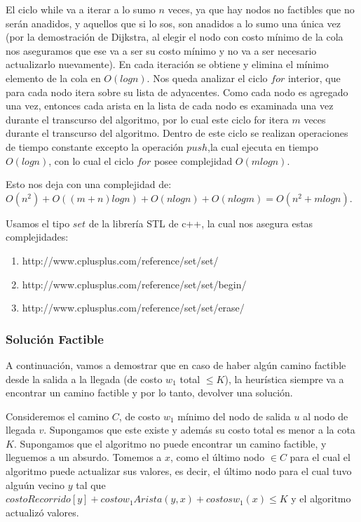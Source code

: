 \vspace{2mm}

El ciclo while va a iterar a lo sumo $n$ veces, ya que hay nodos no factibles que no ser\'an anadidos, y aquellos que si lo sos, son anadidos a lo sumo una \'unica vez (por la demostraci\'on de Dijkstra, al elegir el nodo con costo m\'inimo de la cola nos aseguramos que ese va a ser su costo m\'inimo y no va a ser necesario actualizarlo nuevamente). En cada iteraci\'on se obtiene y elimina el m\'inimo elemento de la cola en $O(logn)$. Nos queda analizar el ciclo $for$ interior, que para cada nodo itera sobre su lista de adyacentes. Como cada nodo es agregado una vez, entonces cada arista en la lista de cada nodo es examinada una vez durante el transcurso del algoritmo, por lo cual este ciclo for itera $m$ veces durante el transcurso del algoritmo. Dentro de este ciclo se realizan operaciones de tiempo constante excepto la operaci\'on $push$,la cual ejecuta en tiempo $O(logn)$, con lo cual el ciclo $for$ posee complejidad $O(mlogn)$.

\vspace{2mm}

Esto nos deja con una complejidad de: $O(n^2) + O((m+n)log n) + O(n log n) + O(n log m) = O(n^2 + m log n)$.

\vspace{2mm}

Usamos el tipo $set$ de la librer\'ia STL de c++, la cual nos asegura estas complejidades:
\begin{enumerate}
\item http://www.cplusplus.com/reference/set/set/
\item http://www.cplusplus.com/reference/set/set/begin/
\item http://www.cplusplus.com/reference/set/set/erase/
\end{enumerate}

\subsubsection{Soluci\'on Factible}

A continuaci\'on, vamos a demostrar que en caso de haber alg\'un camino factible desde la salida a la llegada (de costo $w_1$ total $\leq K$), la heur\'istica siempre va a encontrar un camino factible y por lo tanto, devolver una soluci\'on.

\vspace{2mm}

Consideremos el camino $C$, de costo $w_1$ m\'inimo del nodo de salida $u$ al nodo de llegada $v$. Supongamos que este existe y adem\'as su costo total es menor a la cota $K$. Supongamos que el algoritmo no puede encontrar un camino factible, y lleguemos a un absurdo. Tomemos a $x$, como el \'ultimo nodo $\in C$ para el cual el algoritmo puede actualizar sus valores, es decir, el \'ultimo nodo para el cual tuvo algu\'un vecino $y$ tal que $costoRecorrido[y] + costow_1Arista(y,x) + costosw_1(x)  \leq K $ y el algoritmo actualiz\'o valores. 

